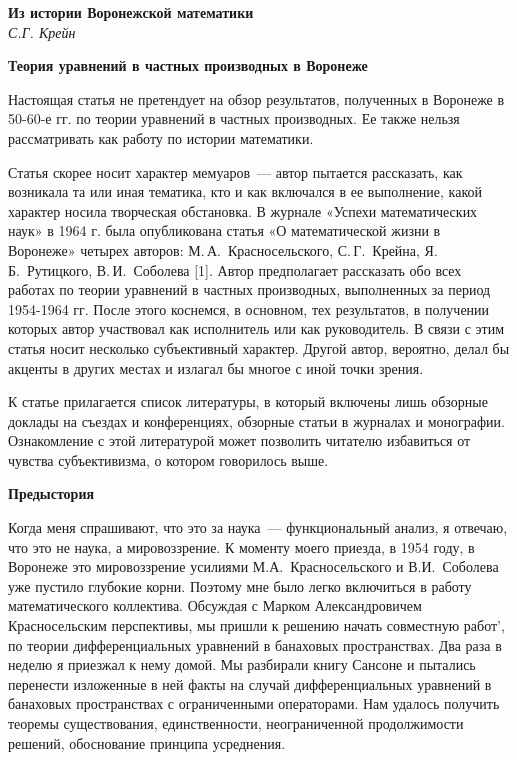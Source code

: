 \begin{center}{ \bf Из истории Воронежской математики}\\
{\it С.Г. Крейн} \\
\end{center}

{ \bf Теория уравнений в частных производных в Воронеже}

Настоящая статья не претендует на обзор результатов, полученных в Воронеже в 50-60-е гг. по теории уравнений в частных производных. Ее также нельзя рассматривать как работу по истории математики.

Статья скорее носит характер мемуаров~--- автор пытается рассказать, как возникала та или иная тематика,
кто и как включался в ее выполнение, какой характер носила творческая обстановка.
В журнале «Успехи математических наук» в 1964 г. была опубликована статья «О математической жизни в Воронеже»
четырех авторов: М.\,А.~Красносельского, С.\,Г.~Крейна, Я.\,Б.~Рутицкого, В.\,И.~Соболева [1].
Автор предполагает рассказать обо всех работах по теории уравнений в частных производных, выполненных за период 1954-1964 гг. После этого коснемся, в основном, тех результатов, в получении которых автор участвовал как исполнитель или как руководитель. В связи с этим статья носит несколько субъективный характер. Другой автор, вероятно, делал бы акценты в других местах и излагал бы многое с иной точки зрения.

К статье прилагается список литературы, в который
\linebreak
включены лишь обзорные доклады на съездах и конференциях,
обзорные статьи в журналах и монографии. Ознакомление с этой литературой может позволить читателю избавиться от чувства субъективизма, о котором говорилось выше.

{\bf Предыстория}

Когда меня спрашивают, что это за наука~--- функциональный анализ, я отвечаю, что это не наука, а мировоззрение.
К моменту моего приезда, в 1954 году, в Воронеже это мировоззрение усилиями М.А.~Красносельского и В.И.~Соболева уже пустило глубокие корни. Поэтому мне было легко включиться в работу математического коллектива. Обсуждая с Марком Александровичем Красносельским перспективы, мы пришли к решению начать совместную работ', по теории дифференциальных уравнений в банаховых пространствах. Два раза в неделю я приезжал к нему домой. Мы разбирали книгу Сансоне и пытались
перенести изложенные в ней факты на случай дифференциальных уравнений в банаховых пространствах с ограниченными операторами. Нам удалось получить теоремы существования, единственности, неограниченной продолжимости решений, обоснование принципа усреднения.

